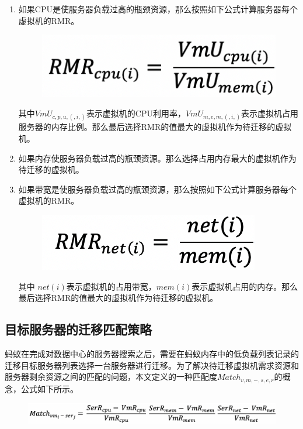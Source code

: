 \begin{enumerate}[(1)]
    \item 如果CPU是使服务器负载过高的瓶颈资源，那么按照如下公式计算服务器每个虚拟机的RMR。

     \begin{figure}[htbp]
      \centering
      \includegraphics[width=0.6\linewidth]{./Figure/IMG_Chap3_12.png}
    \end{figure}

      其中$ VmU_{c,p,u,(,i,)} $表示虚拟机的CPU利用率，$VmU_{m,e,m,(,i,)} $表示虚拟机占用服务器的内存比例。那么最后选择RMR的值最大的虚拟机作为待迁移的虚拟机。
    \item 如果内存使服务器负载过高的瓶颈资源。那么选择占用内存最大的虚拟机作为待迁移的虚拟机。
    \item 如果带宽是使服务器负载过高的瓶颈资源，那么按照如下公式计算服务器每个虚拟机的RMR。

    \begin{figure}[htbp]
      \centering
      \includegraphics[width=0.6\linewidth]{./Figure/IMG_Chap3_13.png}
    \end{figure}

    其中 $ net(i) $表示虚拟机的占用带宽，$ mem(i) $表示虚拟机占用的内存。那么最后选择RMR的值最大的虚拟机作为待迁移的虚拟机。
\end{enumerate}

\subsection{目标服务器的迁移匹配策略}
蚂蚁在完成对数据中心的服务器搜索之后，需要在蚂蚁内存中的低负载列表记录的迁移目标服务器列表选择一台服务器进行迁移。为了解决待迁移虚拟机需求资源和服务器剩余资源之间的匹配的问题，本文定义的一种匹配度$ Match_{v,m,-,s,e,r} $的概念，公式如下所示。

\begin{figure}[htbp]
  \centering
  \includegraphics[width=0.8\linewidth]{./Figure/IMG_Chap3_14.png}
\end{figure}

